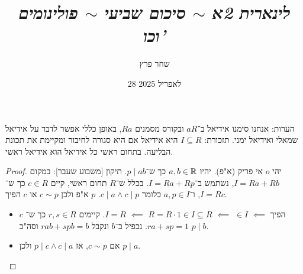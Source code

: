 \documentclass[]{../../../../tex/classes/styledArticle}
\author{שחר פרץ}
\title{\textit{לינארית 2א $\sim$ סיכום שביעי $\sim$ פולינומים וכו'}}
\date{28 לאפריל 2025}
\begin{document}
	\maketitle
	הערות: אנחנו סימנו אידיאל ב־$aR$ ובקורס מסמנים $Ra$, באופן כללי אפשר לדבר על אידיאל שמאלי ואידיאל ימני. תזכורת: $I \subseteq R$ היא אידיאל אם היא סגורה לחיבור ומקיימת את תכונת הבליעה. בתחום ראשי כל אידיאל הוא אידיאל ראשי. 
	
	\begin{proof}
		יהי $o$ אי פריק (א"פ). יהיו $a, b \in \mathbb{R}$ כך ש־$p \mid ab$. תיקון [משבוע שעבר]: במקום $I = Ra + Rb$, נשתמש ב־$I = Ra + Rp$. 
		בכלל ש־$R$ תחום ראשי, קיים $c \in R$ כך ש־$I = Rc$, ו־$a, p \in I$ כלומר $c \mid a \land c \mid p$. $p$ א"פ ולכן $c \sim p$ או $c$ הפיך. 
		\begin{itemize}
			\item $c$ הפיך $\impliedby$ $ \in I$ $\impliedby$ $R = R \cdot 1 \in I \subseteq R$ $\impliedby$ $I = R$. קיימים $r, s \in R$ כך ש־$ra + sp = 1$. נכפיל ב־$b$ ונקבל $rab + spb = b$ וסה"כ $p \mid b$. 
			\item אם $c \sim p$, אז $p \mid c \land c \mid a$ ולכן $p \mid a$. 
		\end{itemize}
	\end{proof}
	
	
	
\end{document}
